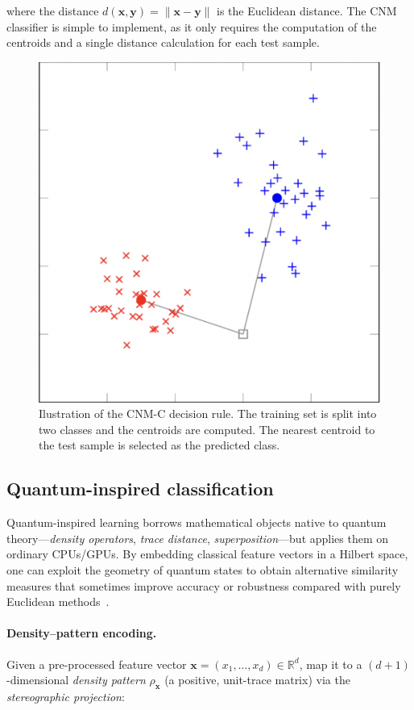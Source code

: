 \documentclass[twocolumn]{article} %
\begin{document}
where the distance \(d(\mathbf x, \mathbf y) = \|\mathbf x - \mathbf y\|\) is the Euclidean distance. 
The CNM classifier is simple to implement, as it only requires the computation of the centroids and a single distance calculation for each test sample.


\begin{figure}[h]
    \centering
    \includegraphics[width=0.6\linewidth]{figures/nearest_mean_classifier.png}
    \caption{Ilustration of the CNM-C decision rule. The training set is split into two classes and the centroids are computed. The nearest centroid to the test sample is selected as the predicted class.}
    \label{fig:nearest_mean_classifier}
\end{figure}

\subsection{Quantum-inspired classification}
\label{subsec:qic}

Quantum-inspired learning borrows mathematical objects native to
quantum theory—\emph{density operators}, \emph{trace distance},
\emph{superposition}—but applies them on ordinary CPUs/GPUs.  By
embedding classical feature vectors in a Hilbert space, one can exploit
the geometry of quantum states to obtain alternative similarity
measures that sometimes improve accuracy or robustness compared with
purely Euclidean methods~\cite{Sergioli2025}.

\paragraph{Density--pattern encoding.}
Given a pre-processed feature vector
\(\mathbf x=(x_{1},\dots,x_{d})\in\mathbb R^{d}\),
map it to a \((d\!+\!1)\)-dimensional \emph{density pattern}
\(\rho_{\mathbf x}\) (a positive, unit-trace matrix) via the
\emph{stereographic projection}:
\end{document}
